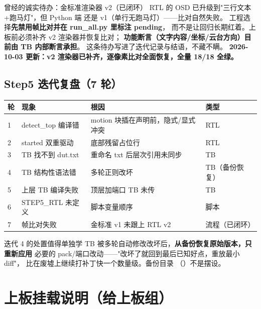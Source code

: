 \begin{warnbox}{曾经的诚实待办：金标准渲染器 v2（已闭环）}
RTL 的 OSD 已升级到"三行文本+跑马灯"，但 Python 端
 还是 v1（单行无跑马灯）——比对自然失败。
工程选择\textbf{先禁用帧比对并在 run\_all.py 里标注 pending}，
而不是让回归长期红着。上板前必须补齐 v2 渲染器并恢复比对；
\textbf{功能断言（文字内容/坐标/云台方向）目前由 TB 内部断言承担}。
这条待办写进了迭代记录与结语，不藏不瞒。
\textbf{2026-10-03 更新：v2 渲染器已补齐，逐像素比对全面恢复，全量 18/18 全绿。}
\end{warnbox}

\subsection{Step5 迭代复盘（7 轮）}

\begin{center}
\begin{tabular}{llp{5.2cm}l}
\toprule
\rowcolor{rowtint}\textbf{轮} & \textbf{现象} & \textbf{根因} & \textbf{类型} \\
\midrule
1 & detect\_top 编译错 & motion 块插在声明前，隐式/显式冲突 & RTL \\
2 & started 双重驱动 & 底部残留占位行 & RTL \\
3 & TB 找不到 dut.txt & 重命名 txt 后层次引用未同步 & TB \\
4 & TB 结构性语法错 & 多轮正则改坏 & TB（备份恢复） \\
5 & 上层 TB 编译失败 & 顶层加端口 TB 未传 & TB \\
6 & STEP5\_RTL 未定义 & 脚本变量顺序 & 脚本 \\
7 & 帧比对失败 & 金标准 v1 未跟上 RTL v2 & 流程（已闭环） \\
\bottomrule
\end{tabular}
\end{center}

\begin{keybox}{迭代 4 的处置值得单独学}
TB 被多轮自动修改改坏后，\textbf{从备份恢复原始版本，只重新应用}
必要的 pack/端口改动——"改坏了就回到最后已知好点，重放最小 diff"，
比在废墟上继续打补丁快一个数量级。备份目录
（）不是摆设。
\end{keybox}

\section{上板挂载说明（给上板组）}

